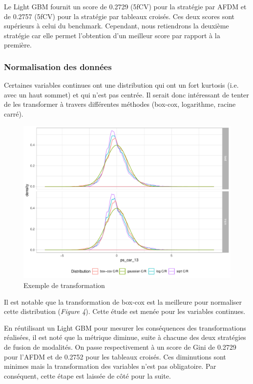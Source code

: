 \documentclass[french]{article}
\begin{document}
\begin{multicols}{2}
Le Light GBM fournit un score de 0.2729 (5fCV) pour la stratégie par AFDM et de 0.2757 (5fCV) pour la stratégie par tableaux croisés. Ces deux scores sont supérieurs à celui du benchmark. Cependant, nous retiendrons la deuxième stratégie car elle permet l'obtention d'un meilleur score par rapport à la première.

\subsubsection{Normalisation des données}

Certaines variables continues ont une distribution qui ont un fort kurtosis (i.e. avec un haut sommet) et qui n'est pas centrée. Il serait donc intéressant de tenter de les transformer à travers différentes méthodes (box-cox, logarithme, racine carré).

\begin{figure}[H] \centering
  \includegraphics[width = 0.99\columnwidth]{img/ex_normalisation}
  \caption{Exemple de transformation}
\end{figure}

Il est notable que la transformation de box-cox est la meilleure pour normaliser cette distribution (\emph{Figure 4}). Cette étude est menée pour les variables continues.

En réutilisant un Light GBM pour mesurer les conséquences des transformations réalisées, il est noté que la métrique diminue, suite à chacune des deux stratégies de fusion de modalités. On passe respectivement à un score de Gini de 0.2729 pour l'AFDM et de 0.2752 pour les tableaux croisés. Ces diminutions sont minimes mais la transformation des variables n'est pas obligatoire. Par conséquent, cette étape est laissée de côté pour la suite. 


\end{multicols}
\end{document}
